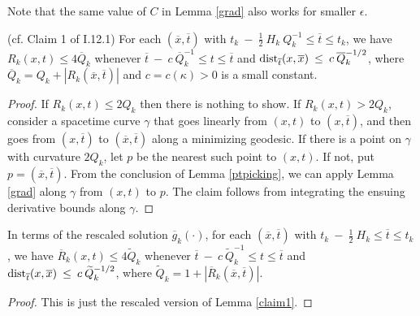 Note that the same value of $C$ in Lemma \ref{grad}
also works for smaller $\epsilon$.

\begin{lemma}
  \label{lem:kl-canonical-neighborhood-theorem-canonical-neighborhoods-lemma-8}
 (cf. Claim 1 of I.12.1)
\label{claim1} For each $(\overline{x}, \overline{t})$ with
$t_k \: - \: \frac12 \: H_k \: Q_k^{-1} \le \overline{t} \le t_k$, we have
$R_k(x, t) \le 4 \overline{Q}_k$ whenever
$\overline{t} \: - \: c \: \overline{Q}_k^{-1} \le t \le \overline{t}$ and
$\operatorname{dist}_{\overline{t}}(x, \overline{x}) \: \le \: c \: \overline{Q}_k^{-1/2}$,
where $\overline{Q}_k = Q_k + |R_k(\overline{x}, \overline{t})|$ and
$c = c(\kappa) > 0$ is a small constant.
\end{lemma}
\begin{proof}
If $R_k(x, t) \le 2Q_k$ then there is nothing to show.  If
$R_k(x, t) > 2Q_k$, consider a spacetime curve $\gamma$ that goes linearly from
$(x,t)$ to $(x, \overline{t})$, and then goes from
$(x, \overline{t})$ to $(\overline{x}, \overline{t})$ along a
minimizing geodesic.  If there is a point on $\gamma$ with curvature
$2Q_k$, let $p$ be the nearest such point to $(x, t)$. If not, put
$p = (\overline{x}, \overline{t})$. From the conclusion of Lemma
\ref{ptpicking}, we can apply
Lemma \ref{grad} along $\gamma$ from $(x, t)$ to $p$.
The claim follows from integrating the ensuing
derivative bounds along $\gamma$.
\end{proof}

\begin{lemma}
  \label{lem:kl-canonical-neighborhood-theorem-canonical-neighborhoods-lemma-9}
 \label{rescaled}
In terms of the rescaled solution $\overline{g}_k(\cdot)$,
for each $(\overline{x}, \overline{t})$ with
$t_k \: - \: \frac12 \: H_k \le \overline{t} \le t_k$, we have
$\overline{R}_k(x, t) \le 4 \widetilde{Q}_k$ whenever
$\overline{t} \: - \: c \: \widetilde{Q}_k^{-1} \le t \le \overline{t}$ and
$\operatorname{dist}_{\overline{t}}(x, \overline{x}) \: \le \: c \: \widetilde{Q}_k^{-1/2}$,
where $\widetilde{Q}_k = 1 + |\overline{R}_k(\overline{x}, \overline{t})|$.
\end{lemma}
\begin{proof}
This is just the rescaled version of Lemma \ref{claim1}.
\end{proof}

